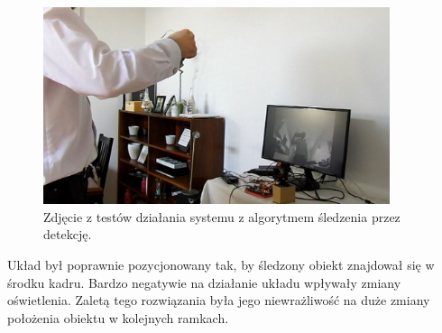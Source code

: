 \begin{figure}[h]
	\centering
	\includegraphics[width=4in]{detekcja_servo.jpg}
	\caption{Zdjęcie z testów działania systemu z algorytmem śledzenia przez detekcję.}
	\label{fig:detekcja_servo}
\end{figure}

Układ był poprawnie pozycjonowany tak, by śledzony obiekt znajdował się w środku kadru. Bardzo negatywie na działanie układu wpływały zmiany oświetlenia. Zaletą tego rozwiązania była jego niewrażliwość na duże zmiany położenia obiektu w kolejnych ramkach.